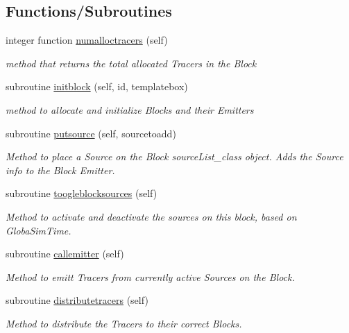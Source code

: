 \subsection*{Functions/\+Subroutines}
\begin{DoxyCompactItemize}
\item 
integer function \mbox{\hyperlink{namespaceblocks__mod_a7202fad0fdc07ff9111e61e3aa513af9}{numalloctracers}} (self)
\begin{DoxyCompactList}\small\item\em method that returns the total allocated Tracers in the Block \end{DoxyCompactList}\item 
subroutine \mbox{\hyperlink{namespaceblocks__mod_a534ca69b17b6f54ee07f995b02feff39}{initblock}} (self, id, templatebox)
\begin{DoxyCompactList}\small\item\em method to allocate and initialize Blocks and their Emitters \end{DoxyCompactList}\item 
subroutine \mbox{\hyperlink{namespaceblocks__mod_ae3bd1bfeee831f4b41932839495bb108}{putsource}} (self, sourcetoadd)
\begin{DoxyCompactList}\small\item\em Method to place a Source on the Block source\+List\+\_\+class object. Adds the Source info to the Block Emitter. \end{DoxyCompactList}\item 
subroutine \mbox{\hyperlink{namespaceblocks__mod_ab9e57cbf0103b632b2b2dfa4e4d4139c}{toogleblocksources}} (self)
\begin{DoxyCompactList}\small\item\em Method to activate and deactivate the sources on this block, based on GlobaSim\+Time. \end{DoxyCompactList}\item 
subroutine \mbox{\hyperlink{namespaceblocks__mod_a2c3cf5113e1422d812c2c869afde2729}{callemitter}} (self)
\begin{DoxyCompactList}\small\item\em Method to emitt Tracers from currently active Sources on the Block. \end{DoxyCompactList}\item 
subroutine \mbox{\hyperlink{namespaceblocks__mod_aa178415bcc40cf169744d356e1a09c6b}{distributetracers}} (self)
\begin{DoxyCompactList}\small\item\em Method to distribute the Tracers to their correct Blocks. \end{DoxyCompactList}\item 

\end{DoxyCompactItemize}
